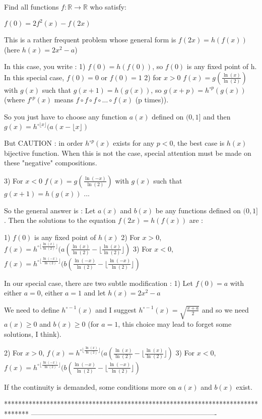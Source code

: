 \begin{mysolution}
	\begin{tcolorbox}Find all functions $f: \mathbb{R}\rightarrow \mathbb{R}$ who satisfy:

$f(0)=2f^{2}(x)-f(2x)$\end{tcolorbox}

This is a rather frequent problem whose general form is $f(2x)=h(f(x))$ (here $h(x)=2x^{2}-a$)

In this case, you write :
1) $f(0)=h(f(0))$, so $f(0)$ is any fixed point of h. In this special case, $f(0)=0$ or $f(0)=1$
2) for $x>0$ $f(x)=g(\frac{\ln(x)}{\ln(2)})$ with $g(x)$ such that $g(x+1)=h(g(x))$, so $g(x+p)=h^{\circ p}(g(x))$ (where $f^{\circ p}(x)$ means $f\circ f\circ f\circ \ldots \circ f(x)$ (p times)).

So you just have to choose any function $a(x)$ defined on $(0,1]$ and then $g(x)=h^{\circ\lfloor x\rfloor}(a(x-\lfloor x\rfloor)$

But CAUTION : in order $h^{\circ p}(x)$ exists for any $p<0$, the best case is $h(x)$ bijective function. When this is not the case, special attention must be made on these "negative" compositions.

3) For $x<0$ $f(x)=g(\frac{\ln(-x)}{\ln(2)})$ with $g(x)$ such that $g(x+1)=h(g(x))$ ...

So the general answer is :
Let $a(x)$ and $b(x)$ be any functions defined on $(0,1]$. Then the solutions to the equation $f(2x)=h(f(x))$ are :

1) $f(0)$ is any fixed point of $h(x)$
2) For $x>0$, $f(x)=h^{\circ\lfloor\frac{\ln(x)}{\ln(2)}\rfloor}(a(\frac{\ln(x)}{\ln(2)}-\lfloor\frac{\ln(x)}{\ln(2)}\rfloor)$
3) For $x<0$, $f(x)=h^{\circ\lfloor\frac{\ln(-x)}{\ln(2)}\rfloor}(b(\frac{\ln(-x)}{\ln(2)}-\lfloor\frac{\ln(-x)}{\ln(2)}\rfloor)$

In our special case, there are two subtle modification :
1) Let $f(0)=a$ with either $a=0$, either $a=1$ and let $h(x)= 2x^{2}-a$

We need to define $h^{\circ-1}(x)$ and I suggest $h^{\circ-1}(x)=\sqrt{\frac{x+a}{2}}$ and so we need $a(x)\geq 0$ and $b(x)\geq 0$ (for $a=1$, this choice may lead to forget some solutions, I think).

2) For $x>0$, $f(x)=h^{\circ\lfloor\frac{\ln(x)}{\ln(2)}\rfloor}(a(\frac{\ln(x)}{\ln(2)}-\lfloor\frac{\ln(x)}{\ln(2)}\rfloor)$
3) For $x<0$, $f(x)=h^{\circ\lfloor\frac{\ln(-x)}{\ln(2)}\rfloor}(b(\frac{\ln(-x)}{\ln(2)}-\lfloor\frac{\ln(-x)}{\ln(2)}\rfloor)$

If the continuity is demanded, some conditions more on $a(x)$ and $b(x)$ exist.
\end{mysolution}
*******************************************************************************
-------------------------------------------------------------------------------

